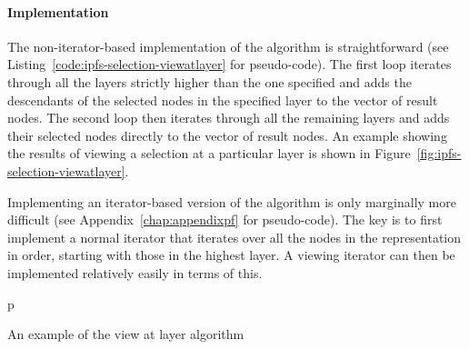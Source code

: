 \paragraph{Implementation}

The non-iterator-based implementation of the algorithm is straightforward (see Listing~\ref{code:ipfs-selection-viewatlayer} for pseudo-code). The first loop iterates through all the layers strictly higher than the one specified and adds the descendants of the selected nodes in the specified layer to the vector of result nodes. The second loop then iterates through all the remaining layers and adds their selected nodes directly to the vector of result nodes. An example showing the results of viewing a selection at a particular layer is shown in Figure~\ref{fig:ipfs-selection-viewatlayer}.

Implementing an iterator-based version of the algorithm is only marginally more difficult (see Appendix~\ref{chap:appendixpf} for pseudo-code). The key is to first implement a normal iterator that iterates over all the nodes in the representation in order, starting with those in the highest layer. A viewing iterator can then be implemented relatively easily in terms of this.

\begin{stusubfig}{p}
	\hspace{4mm}%
\caption{An example of the view at layer algorithm}
\label{fig:ipfs-selection-viewatlayer}
\end{stusubfig}

